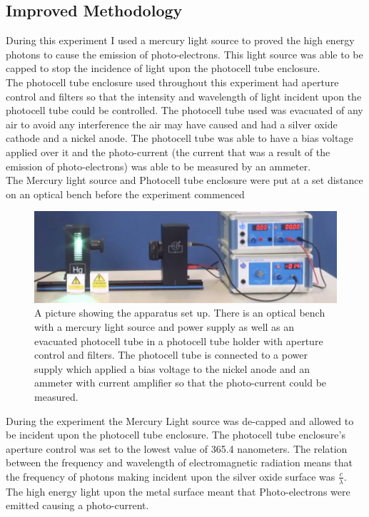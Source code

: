 \documentclass[12pt]{article}
\begin{document}
\subsection{Improved Methodology}
During this experiment I used a mercury light source to proved the high energy photons to cause the emission of photo-electrons. This light source was able to be capped to stop the incidence of light upon the photocell tube enclosure.\\ 
The photocell tube enclosure used throughout this experiment had aperture control and filters so that the intensity and wavelength of light incident upon the photocell tube could be controlled. The photocell tube used was evacuated of any air to avoid any interference the air may have caused and had a silver oxide cathode and a nickel anode. The photocell tube was able to have a bias voltage applied over it and the photo-current (the current that was a result of the emission of photo-electrons) was able to be measured by an ammeter.\\
The Mercury light source and Photocell tube enclosure were put at a set distance on an optical bench before the experiment commenced
\\
 \begin{figure}[ht!]
    \includegraphics[scale=0.4]{Photocell tube picture.png}
    \caption{A picture showing the apparatus set up. There is an optical bench with a mercury light source and power supply as well as an evacuated photocell tube in a photocell tube holder with aperture control and filters. The photocell tube is connected to a power supply which applied a bias voltage to the nickel anode and an ammeter with current amplifier so that the photo-current could be measured.}
    \label{fig:3}
\end{figure}

During the experiment the Mercury Light source was de-capped and allowed to be incident upon the photocell tube enclosure. The photocell tube enclosure's aperture control was set to the lowest value of 365.4 nanometers. The relation between the frequency and wavelength of electromagnetic radiation means that the frequency of photons making incident upon the silver oxide surface was $\frac{c}{\lambda}$. The high energy light upon the metal surface meant that Photo-electrons were emitted causing a photo-current.\\
\end{document}

